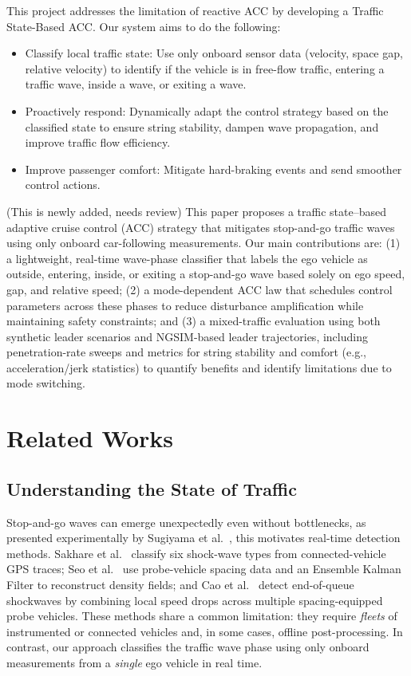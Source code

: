 \documentclass[conference]{IEEEtran}
\begin{document}
This project addresses the limitation of reactive ACC by developing a Traffic State-Based ACC. Our system aims to do the following:

\begin{itemize}

\item Classify local traffic state: Use only onboard sensor data (velocity, space gap, relative velocity) to identify if the vehicle is in free-flow traffic, entering a traffic wave, inside a wave, or exiting a wave.
\item Proactively respond: Dynamically adapt the control strategy based on the classified state to ensure string stability, dampen wave propagation, and improve traffic flow efficiency.
\item Improve passenger comfort: Mitigate hard-braking events and send smoother control actions.
\end{itemize}

(This is newly added, needs review) This paper proposes a traffic state–based adaptive cruise control (ACC) strategy that mitigates stop-and-go traffic waves using only onboard car-following measurements. Our main contributions are: (1) a lightweight, real-time wave-phase classifier that labels the ego vehicle as outside, entering, inside, or exiting a stop-and-go wave based solely on ego speed, gap, and relative speed; (2) a mode-dependent ACC law that schedules control parameters across these phases to reduce disturbance amplification while maintaining safety constraints; and (3) a mixed-traffic evaluation using both synthetic leader scenarios and NGSIM-based leader trajectories, including penetration-rate sweeps and metrics for string stability and comfort (e.g., acceleration/jerk statistics) to quantify benefits and identify limitations due to mode switching.


\section{Related Works}
\subsection{Understanding the State of Traffic}
Stop-and-go waves can emerge unexpectedly even without bottlenecks, as presented experimentally by Sugiyama et al.\ \cite{Sugiyama2008}, this motivates real-time detection methods. Sakhare et al.\ \cite{futuretransp3040063} classify six shock-wave types from connected-vehicle GPS traces; Seo et al.\ \cite{7313231} use probe-vehicle spacing data and an Ensemble Kalman Filter to reconstruct density fields; and Cao et al.\ \cite{https://doi.org/10.1049/iet-its.2018.5124} detect end-of-queue shockwaves by combining local speed drops across multiple spacing-equipped probe vehicles. These methods share a common limitation: they require \emph{fleets} of instrumented or connected vehicles and, in some cases, offline post-processing. In contrast, our approach classifies the traffic wave phase using only onboard measurements from a \emph{single} ego vehicle in real time.
\end{document}
